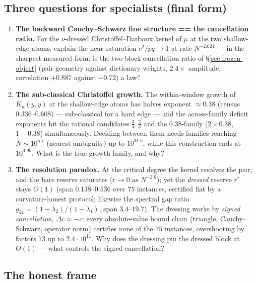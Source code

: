 \documentclass[11pt]{article}
\theoremstyle{remark}
\begin{document}
\subsection{Three questions for specialists (final form)}
\label{sec:frozen-questions}

\begin{enumerate}
\item[(q1)] \textbf{The backward Cauchy--Schwarz fine structure ==
the cancellation ratio.}  For the $\nu$-dressed
Christoffel--Darboux kernel of $\mu$ at the two shallow-edge atoms,
explain the near-saturation $c^{2}/pq\to1$ at rate $N^{-2.624}$ ---
in the sharpest measured form: is the two-block cancellation ratio
of \S\ref{sec:frozen-object} (pair geometry against dictionary
weights, $2.4\times$ amplitude, correlation $+0.887$ against
$-0.72$) a law?
\item[(q2)] \textbf{The sub-classical Christoffel growth.}  The
within-window growth of $K_{n}(y,y)$ at the shallow-edge atoms has
halves exponent $\approx0.38$ (census $0.336$--$0.608$) ---
sub-classical for a hard edge --- and the across-family deficit
exponents hit the rational candidates $\tfrac34,\tfrac23$ and the
$0.38$-family ($2\times0.38$, $1-0.38$) simultaneously.  Deciding
between them needs families reaching $N\sim10^{5.4}$ (nearest
ambiguity) up to $10^{31.5}$, while this construction ends at
$10^{3.90}$.  What is the true growth family, and why?
\item[(q3)] \textbf{The resolution paradox.}  At the critical degree
the kernel resolves the pair, and the bare reserve saturates
($r\to0$ as $N^{-2.6}$); yet the \emph{dressed} reserve $r'$ stays
$O(1)$ (span $0.138$--$0.536$ over $75$ instances, certified flat by
a curvature-honest protocol; likewise the spectral gap ratio
$g_{21}=(1-\lambda_{2})/(1-\lambda_{1})$, span $3.4$--$19.7$).  The
dressing works by \emph{signed cancellation}, $\Delta c\approx-c$:
every absolute-value bound chain (triangle, Cauchy--Schwarz,
operator norm) certifies none of the $75$ instances, overshooting by
factors $73$ up to $2.4\cdot10^{11}$.  Why does the dressing pin the
dressed block at $O(1)$ --- what controls the signed cancellation?
\end{enumerate}

\subsection{The honest frame}\label{sec:frozen-status}
\end{document}
